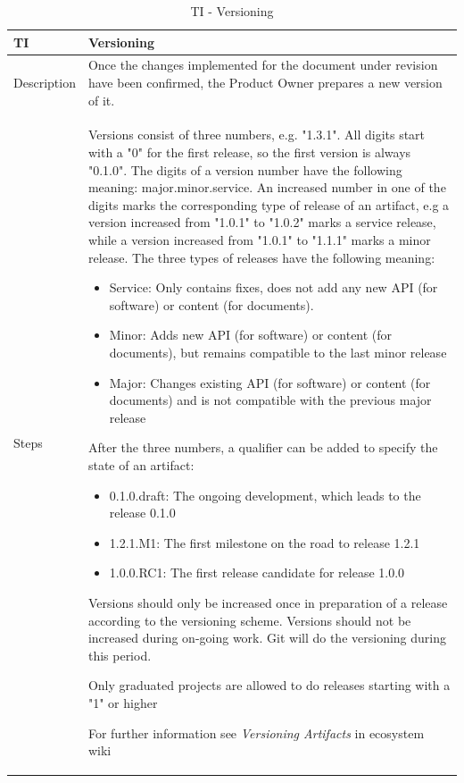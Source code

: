 \documentclass{template/openetcs_article}
\begin{document}
\begin{table}[H]
\begin{tabular}{|m{2cm}|m{12cm}|}
\hline
\rowcolor{myblue}
TI & 
Versioning
\\\hline
Description &
Once the changes implemented for the document under revision have been confirmed, the Product Owner prepares a new version of it.
\\\hline
Steps &
Versions consist of three numbers, e.g. "1.3.1". All digits start with a "0" for the first release, so the first version is always "0.1.0". The digits of a version number have the following meaning: major.minor.service. An increased number in one of the digits marks the corresponding type of release of an artifact, e.g a version increased from "1.0.1" to "1.0.2" marks a service release, while a version increased from "1.0.1" to "1.1.1" marks a minor release. The three types of releases have the following meaning:
\begin{itemize}
\item Service: Only contains fixes, does not add any new API (for software) or content (for documents).
\item Minor: Adds new API (for software) or content (for documents), but remains compatible to the last minor release
\item Major: Changes existing API (for software) or content (for documents) and is not compatible with the previous major release
\end{itemize}
After the three numbers, a qualifier can be added to specify the state of an artifact:
\begin{itemize}
\item 0.1.0.draft: The ongoing development, which leads to the release 0.1.0
\item 1.2.1.M1: The first milestone on the road to release 1.2.1
\item 1.0.0.RC1: The first release candidate for release 1.0.0
\end{itemize}
Versions should only be increased once in preparation of a release according to the versioning scheme. Versions should not be increased during on-going work. Git will do the versioning during this period.

Only graduated projects are allowed to do releases starting with a "1" or higher

For further information see {\it Versioning Artifacts} in ecosystem wiki
\\\hline
\end{tabular}
\caption{TI - Versioning}
\end{table}
\end{document}
